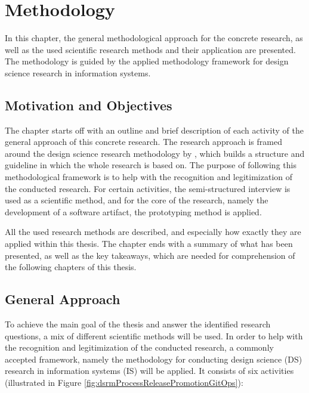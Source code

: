 \chapter{Methodology}
\label{methodology}

In this chapter,
the general methodological approach for the concrete research,
as well as
the used scientific research methods and their application
are presented.
The methodology is guided by the applied methodology framework
for design science research in information systems.






\section{Motivation and Objectives}
\label{methodology:motivation-and-objectives}


The chapter  starts off with an outline and brief description
of each activity of the general approach of this concrete research.
The research approach is framed around the design science research methodology by
\autocite{designScienceResearchMethodologyForInformationSystemsResearch},
which builds a structure and guideline in which the whole research is based on.
The purpose of following this methodological framework is to help with the recognition and
legitimization of the conducted research.
For certain activities, the semi-structured interview is used as a scientific method,
and for the core of the research, namely the development of a software artifact,
the prototyping method is applied.

All the used research methods are described,
and especially how exactly they are applied within this thesis.
The chapter ends with a summary of what has been presented,
as well as the key takeaways, which are needed for comprehension of the following chapters of this thesis.





\section{General Approach}
\label{methodology:approach}

To achieve the main goal of the thesis and answer the identified research questions,
a mix of different scientific methods will be used.
In order to help with the recognition and legitimization of the conducted research,
a commonly accepted framework, namely
the methodology for conducting design science (DS) research
in information systems (IS)
\autocite{designScienceResearchMethodologyForInformationSystemsResearch}
will be applied.
It consists of six activities
(illustrated in Figure \ref{fig:dsrmProcessReleasePromotionGitOps}):

